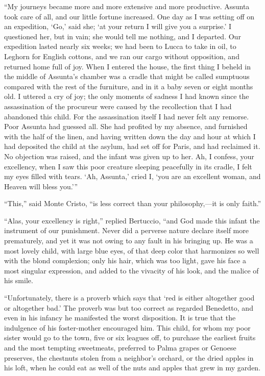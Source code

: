 “My journeys became more and more extensive and more productive.
Assunta took care of all, and our little fortune increased. One day as
I was setting off on an expedition, ‘Go,’ said she; ‘at your return I
will give you a surprise.’ I questioned her, but in vain; she would
tell me nothing, and I departed. Our expedition lasted nearly six
weeks; we had been to Lucca to take in oil, to Leghorn for English
cottons, and we ran our cargo without opposition, and returned home
full of joy. When I entered the house, the first thing I beheld in the
middle of Assunta’s chamber was a cradle that might be called sumptuous
compared with the rest of the furniture, and in it a baby seven or
eight months old. I uttered a cry of joy; the only moments of sadness I
had known since the assassination of the procureur were caused by the
recollection that I had abandoned this child. For the assassination
itself I had never felt any remorse. Poor Assunta had guessed all. She
had profited by my absence, and furnished with the half of the linen,
and having written down the day and hour at which I had deposited the
child at the asylum, had set off for Paris, and had reclaimed it. No
objection was raised, and the infant was given up to her. Ah, I
confess, your excellency, when I saw this poor creature sleeping
peacefully in its cradle, I felt my eyes filled with tears. ‘Ah,
Assunta,’ cried I, ‘you are an excellent woman, and Heaven will bless
you.’”

“This,” said Monte Cristo, “is less correct than your philosophy,—it is
only faith.”

“Alas, your excellency is right,” replied Bertuccio, “and God made this
infant the instrument of our punishment. Never did a perverse nature
declare itself more prematurely, and yet it was not owing to any fault
in his bringing up. He was a most lovely child, with large blue eyes,
of that deep color that harmonizes so well with the blond complexion;
only his hair, which was too light, gave his face a most singular
expression, and added to the vivacity of his look, and the malice of
his smile.

“Unfortunately, there is a proverb which says that ‘red is either
altogether good or altogether bad.’ The proverb was but too correct as
regarded Benedetto, and even in his infancy he manifested the worst
disposition. It is true that the indulgence of his foster-mother
encouraged him. This child, for whom my poor sister would go to the
town, five or six leagues off, to purchase the earliest fruits and the
most tempting sweetmeats, preferred to Palma grapes or Genoese
preserves, the chestnuts stolen from a neighbor’s orchard, or the dried
apples in his loft, when he could eat as well of the nuts and apples
that grew in my garden.

